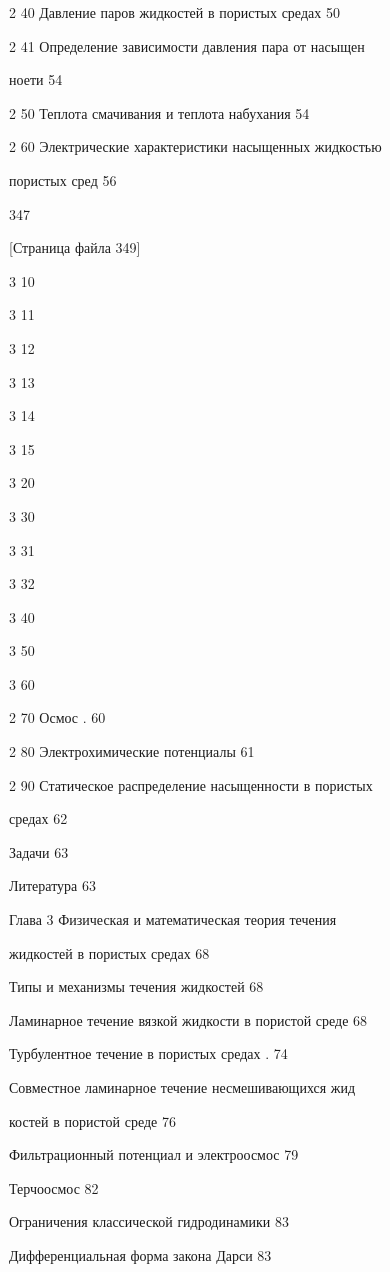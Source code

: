 \documentclass[
  11pt,
]{article}
\begin{document}
2 40 Давление паров жидкостей в пористых средах 50 \par
2 41 Определение зависимости давления пара от насыщен \par
ноети 54 \par
2 50 Теплота смачивания и теплота набухания 54 \par
2 60 Электрические характеристики насыщенных жидкостью \par
пористых сред 56 \par
347 \par
\smallskip
\smallskip
\smallskip
{[}Страница файла 349{]}\par
3 10 \par
3 11 \par
3 12 \par
3 13 \par
3 14 \par
3 15 \par
3 20 \par
3 30 \par
3 31 \par
3 32 \par
3 40 \par
3 50 \par
3 60 \par
2 70 Осмос . 60 \par
2 80 Электрохимические потенциалы 61 \par
2 90 Статическое распределение насыщенности в пористых \par
средах 62 \par
Задачи 63 \par
Литература 63 \par
Глава 3 Физическая и математическая теория течения \par
жидкостей в пористых средах 68 \par
Типы и механизмы течения жидкостей 68 \par
Ламинарное течение вязкой жидкости в пористой среде 68 \par
Турбулентное течение в пористых средах . 74 \par
Совместное ламинарное течение несмешивающихся жид \par
костей в пористой среде 76 \par
Фильтрационный потенциал и электроосмос 79 \par
Терчоосмос 82 \par
Ограничения классической гидродинамики 83 \par
Дифференциальная форма закона Дарси 83 \par
\end{document}
